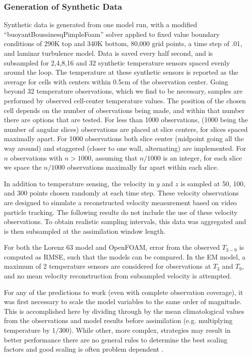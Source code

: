\documentclass[12pt]{report}
\begin{document}
\subsubsection{Generation of Synthetic Data}

Synthetic data is generated from one model run, with a modified ``buoyantBoussinesqPimpleFoam'' solver applied to fixed value boundary conditions of 290K top and 340K bottom, 80,000 grid points, a time step of .01, and laminar turbulence model.
Data is saved every half second, and is subsampled for 2,4,8,16 and 32 synthetic temperature sensors spaced evenly around the loop.
The temperature at these synthetic sensors is reported as the average for cells with centers within 0.5cm of the observation center.
Going beyond 32 temperature observations, which we find to be necessary, samples are performed by observed cell-center temperature values.
The position of the chosen cell depends on the number of observations being made, and within that number there are options that are tested.
For less than 1000 observations, (1000 being the number of angular slices) observations are placed at slice centers, for slices spaced maximally apart.
For 1000 observations both slice center (midpoint going all the way around) and staggered (closer to one wall, alternating) are implemented.
For $n$ observations with $n>1000$, assuming that $n/1000$ is an integer, for each slice we space the $n/1000$ observations maximally far apart within each slice.

In addition to temperature sensing, the velocity in $y$ and $z$ is sampled at 50, 100, and 300 points chosen randomly at each time step.
These velocity observations are designed to simulate a reconstructed velocity measurement based on video particle tracking.
The following results do not include the use of these velocity observations.
To obtain realistic sampling intervals, this data was aggregated and is then subsampled at the assimilation window length.

For both the Lorenz 63 model and OpenFOAM, error from the observed $T_{3-9}$ is computed as RMSE, such that the models can be compared.
In the EM model, a maximum of 2 temperature sensors are considered for observations at $T_3$ and $T_9$, and no mean velocity reconstruction from subsampled velocity is attempted.

For any of the predictions to work (even with complete observation coverage), it was first necessary to scale the model variables to the same order of magnitude.
This is accomplished here by dividing through by the mean climatological values from the observations and model results before assimilation (e.g. multiplying temperature by $1/300$). 
While other, more complex, strategies may result in better performance there are no general rules to determine the best scaling factors and good scaling is often problem dependent .
\end{document}
